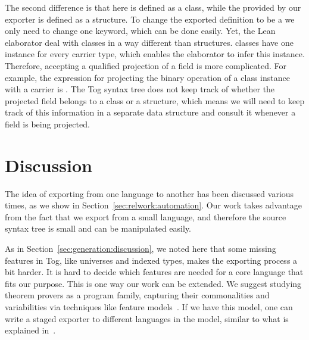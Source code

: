 The second difference is that  here is defined as a class, while the  provided by our exporter is defined as a structure. To change the exported definition to be a  we only need to change one keyword, which can be done easily. Yet, the Lean elaborator deal with classes in a way different than structures. classes have one instance for every carrier type, which enables the elaborator to infer this instance. Therefore, accepting a qualified projection of a  field is more complicated. For example, the expression for projecting the binary operation  of a  class instance  with a carrier  is . The Tog syntax tree does not keep track of whether the projected field belongs to a class or a structure, which means we will need to keep track of this information in a separate data structure and consult it whenever a field is being projected. 

\section{Discussion}
\label{sec:exporting:discussion}
The idea of exporting from one language to another has been discussed various times, as we show in Section~\ref{sec:relwork:automation}. Our work takes advantage from the fact that we export from a small language, and therefore the source syntax tree is small and can be manipulated easily.  

As in Section~\ref{sec:generation:discussion}, we noted here that some missing features in Tog, like universes and indexed types, makes the exporting process a bit harder. It is hard to decide which features are needed for a core language that fits our purpose. This is one way our work can be extended. We suggest studying theorem provers as a program family, capturing their commonalities and variabilities via techniques like feature models~\cite{czarnecki2000generative}. If we have this model, one can write a staged exporter to different languages in the model, similar to what is explained in~\cite{stagedConfig}. 


